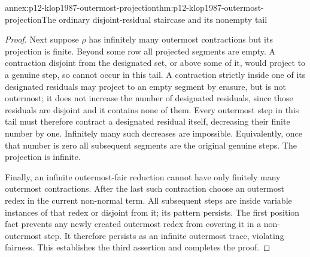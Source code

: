 \begin{annexitem}{annex:p12-klop1987-outermost-projection}{thm:p12-klop1987-outermost-projection}{The ordinary disjoint-residual staircase and its nonempty tail}
\begin{proof}
Next suppose \(\rho\) has infinitely many outermost contractions
but its projection is finite. Beyond some row all projected segments
are empty. A contraction disjoint from the designated set, or above
some of it, would project to a genuine step, so cannot occur in this
tail. A contraction strictly inside one of its designated residuals
may project to an empty segment by erasure, but is not outermost; it
does not increase the number of designated residuals, since those
residuals are disjoint and it contains none of them. Every outermost
step in this tail must therefore contract a designated residual itself,
decreasing their finite number by one. Infinitely many such decreases
are impossible. Equivalently, once that number is zero all subsequent
segments are the original genuine steps. The projection is infinite.

Finally, an infinite outermost-fair reduction cannot have only finitely
many outermost contractions. After the last such contraction choose an
outermost redex in the current non-normal term. All subsequent steps
are inside variable instances of that redex or disjoint from it; its
pattern persists. The first position fact prevents any newly created
outermost redex from covering it in a non-outermost step. It therefore
persists as an infinite outermost trace, violating fairness. This
establishes the third assertion and completes the proof.
\end{proof}
\end{annexitem}

